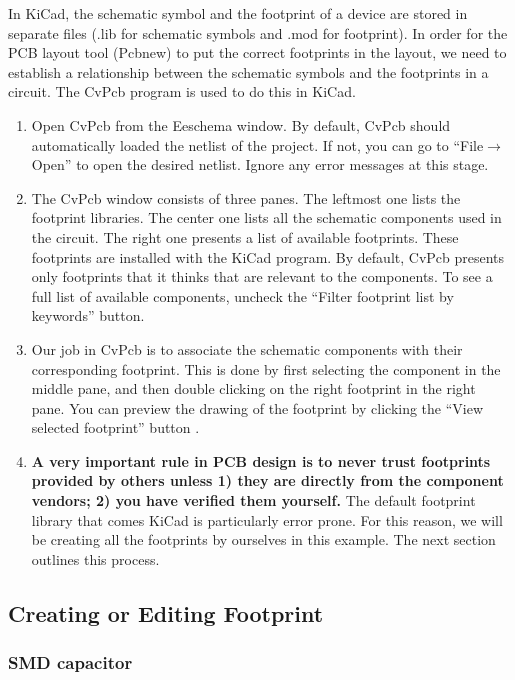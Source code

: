 \documentclass[12pt,letterpaper]{scrartcl}
\begin{document}
In KiCad, the schematic symbol and the footprint of a device are stored in separate files (.lib for schematic symbols and .mod for footprint). In order for the PCB layout tool (Pcbnew) to put the correct footprints in the layout, we need to establish a relationship between the schematic symbols and the footprints in a circuit. The CvPcb program is used to do this in KiCad. 

\begin{enumerate}
	\item Open CvPcb from the Eeschema window. By default, CvPcb should automatically loaded the netlist of the project. If not, you can go to ``File$\rightarrow$Open'' to open the desired netlist. Ignore any error messages at this stage.
	
	\item The CvPcb window consists of three panes. The leftmost one lists the footprint libraries. The center one lists all the schematic components used in the circuit. The right one presents a list of available footprints. These footprints are installed with the KiCad program. By default, CvPcb presents only footprints that it thinks that are relevant to the components. To see a full list of available components, uncheck the ``Filter footprint list by keywords'' button. 
	
	\item Our job in CvPcb is to associate the schematic components with their corresponding footprint. This is done by first selecting the component in the middle pane, and then double clicking on the right footprint in the right pane. You can preview the drawing of the footprint by clicking the ``View selected footprint'' button . 
	
	\item \textbf{A very important rule in PCB design is to never trust footprints provided by others unless 1) they are directly from the component vendors; 2) you have verified them yourself.} The default footprint library that comes KiCad is particularly error prone. For this reason, we will be creating all the footprints by ourselves in this example. The next section outlines this process. 
\end{enumerate}

\subsection{Creating or Editing Footprint}

\subsubsection{SMD capacitor}
\label{sec:smd_cap_footprint}
\end{document}

